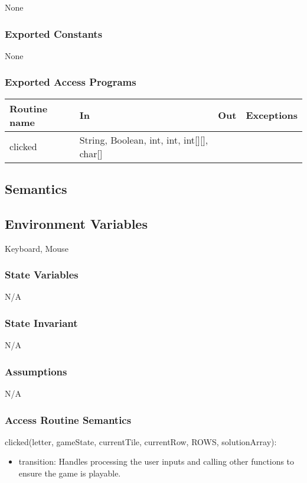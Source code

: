 \documentclass[12pt]{article}
\begin{document}
None

\subsubsection* {Exported Constants}

None

\subsubsection* {Exported Access Programs}
\begin{tabular}{| l | l | l | p{6cm} |}
\hline
\textbf{Routine name} & \textbf{In} & \textbf{Out} & \textbf{Exceptions}\\
\hline
clicked & String, Boolean, int, int, int[][], char[] & ~ &  \\
\hline
\end{tabular}


\subsection* {Semantics}

\subsection*{Environment Variables}

Keyboard, Mouse

\subsubsection* {State Variables}
N/A

\subsubsection* {State Invariant}

N/A

\subsubsection* {Assumptions}

N/A

\subsubsection* {Access Routine Semantics}

\noindent clicked(letter, gameState, currentTile, currentRow, ROWS, solutionArray):
\begin{itemize}
  \item transition: Handles processing the user inputs and calling other functions to ensure the game is playable.
\end{itemize}
\end{document}

